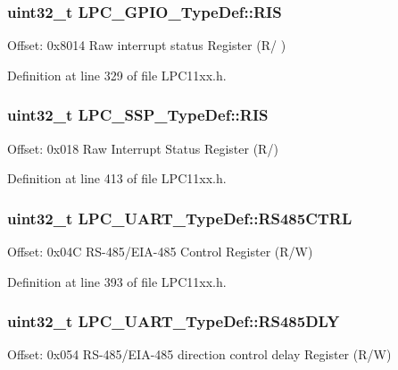 \subsubsection[{\texorpdfstring{R\+IS}{RIS}}]{ uint32\+\_\+t L\+P\+C\+\_\+\+G\+P\+I\+O\+\_\+\+Type\+Def\+::\+R\+IS}\hypertarget{group___l_p_c11xx___definitions_ga804c5ae638accaaaff4d1d044e788b55}{}\label{group___l_p_c11xx___definitions_ga804c5ae638accaaaff4d1d044e788b55}
Offset\+: 0x8014 Raw interrupt status Register (R/ ) 

Definition at line 329 of file L\+P\+C11xx.\+h.

\subsubsection[{\texorpdfstring{R\+IS}{RIS}}]{ uint32\+\_\+t L\+P\+C\+\_\+\+S\+S\+P\+\_\+\+Type\+Def\+::\+R\+IS}\hypertarget{group___l_p_c11xx___definitions_gadbbc9a0280708e15f5f7cca5270df738}{}\label{group___l_p_c11xx___definitions_gadbbc9a0280708e15f5f7cca5270df738}
Offset\+: 0x018 Raw Interrupt Status Register (R/) 

Definition at line 413 of file L\+P\+C11xx.\+h.

\subsubsection[{\texorpdfstring{R\+S485\+C\+T\+RL}{RS485CTRL}}]{ uint32\+\_\+t L\+P\+C\+\_\+\+U\+A\+R\+T\+\_\+\+Type\+Def\+::\+R\+S485\+C\+T\+RL}\hypertarget{group___l_p_c11xx___definitions_ga7a486c0c1ea4054b08a3893a6d7d1202}{}\label{group___l_p_c11xx___definitions_ga7a486c0c1ea4054b08a3893a6d7d1202}
Offset\+: 0x04C R\+S-\/485/\+E\+I\+A-\/485 Control Register (R/W) 

Definition at line 393 of file L\+P\+C11xx.\+h.

\subsubsection[{\texorpdfstring{R\+S485\+D\+LY}{RS485DLY}}]{ uint32\+\_\+t L\+P\+C\+\_\+\+U\+A\+R\+T\+\_\+\+Type\+Def\+::\+R\+S485\+D\+LY}\hypertarget{group___l_p_c11xx___definitions_ga115176a87a83f57041b8ee50e2a4bc98}{}\label{group___l_p_c11xx___definitions_ga115176a87a83f57041b8ee50e2a4bc98}
Offset\+: 0x054 R\+S-\/485/\+E\+I\+A-\/485 direction control delay Register (R/W) 

